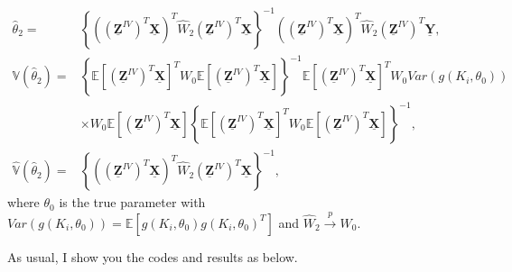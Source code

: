 \documentclass[
  12pt,
]{article}
\begin{document}
\begin{align*}
    \hat{\theta}_2  = & \left\{\left((\mathbf{\underline{Z}}^{IV})^T \mathbf{\underline{X}} \right)^T \widehat{W}_2 (\mathbf{\underline{Z}}^{IV})^T \mathbf{\underline{X}} \right\}^{-1} \left((\mathbf{\underline{Z}}^{IV})^T \mathbf{\underline{X}} \right)^T \widehat{W}_2 (\mathbf{\underline{Z}}^{IV})^T \mathbf{\underline{Y}},\\
    \mathbb{V}(\hat{\theta}_2) = 
    & \left\{ \mathbb{E}\left[ (\mathbf{\underline{Z}}^{IV})^T \mathbf{\underline{X}} \right]^T W_0 \mathbb{E}\left[ (\mathbf{\underline{Z}}^{IV})^T \mathbf{\underline{X}}\right] \right\}^{-1} \mathbb{E}\left[ (\mathbf{\underline{Z}}^{IV})^T \mathbf{\underline{X}} \right]^T W_0 Var\left( g(K_i, \theta_0)\right)\\
    & \times W_0 \mathbb{E}\left[ (\mathbf{\underline{Z}}^{IV})^T \mathbf{\underline{X}} \right] \left\{ \mathbb{E}\left[ (\mathbf{\underline{Z}}^{IV})^T \mathbf{\underline{X}} \right]^T W_0 \mathbb{E}\left[ (\mathbf{\underline{Z}}^{IV})^T \mathbf{\underline{X}} \right] \right\}^{-1},\\
     \widehat{\mathbb{V}}(\hat{\theta}_2) = 
     & \left\{\left((\mathbf{\underline{Z}}^{IV})^T \mathbf{\underline{X}} \right)^T \widehat{W}_2 (\mathbf{\underline{Z}}^{IV})^T \mathbf{\underline{X}} \right\}^{-1},
\end{align*}
where \(\theta_0\) is the true parameter with \(Var\left( g(K_i, \theta_0)\right) = \mathbb{E}\left[g(K_i, \theta_0)g(K_i, \theta_0)^T \right]\) and \(\widehat{W}_2 \stackrel{p}{\to} W_0\).

As usual, I show you the codes and results as below.
\end{document}
